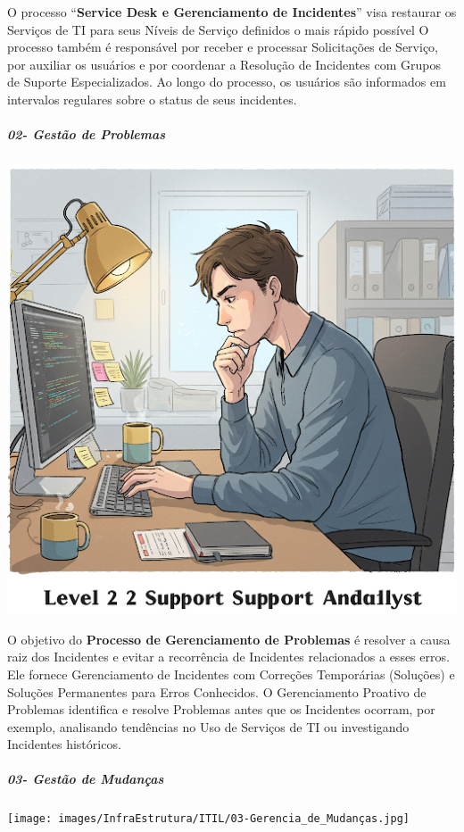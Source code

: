 \documentclass[
]{book}
\begin{document}
O processo ``\textbf{Service Desk e Gerenciamento de Incidentes}'' visa restaurar os Serviços de TI para seus Níveis de Serviço definidos o mais rápido possível O processo também é responsável por receber e processar Solicitações de Serviço, por auxiliar os usuários e por coordenar a Resolução de Incidentes com Grupos de Suporte Especializados. Ao longo do processo, os usuários são informados em intervalos regulares sobre o status de seus incidentes.

\subparagraph{02- Gestão de Problemas}\label{gestuxe3o-de-problemas}

\includegraphics{images/InfraEstrutura/ITIL/02-Gerencia_de_Problemas.jpg}

O objetivo do \textbf{Processo de Gerenciamento de Problemas} é resolver a causa raiz dos Incidentes e evitar a recorrência de Incidentes relacionados a esses erros. Ele fornece Gerenciamento de Incidentes com Correções Temporárias (Soluções) e Soluções Permanentes para Erros Conhecidos. O Gerenciamento Proativo de Problemas identifica e resolve Problemas antes que os Incidentes ocorram, por exemplo, analisando tendências no Uso de Serviços de TI ou investigando Incidentes históricos.

\subparagraph{03- Gestão de Mudanças}\label{gestuxe3o-de-mudanuxe7as}

\texttt{[image: images/InfraEstrutura/ITIL/03-Gerencia\_de\_Mudanças.jpg]}
\end{document}
